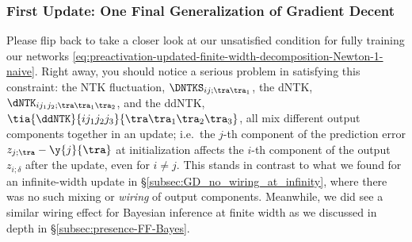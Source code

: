 \subsubsection{First Update: One Final Generalization of Gradient Decent}
Please flip back to take a closer look at our unsatisfied condition for fully training our networks \eqref{eq:preactivation-updated-finite-width-decomposition-Newton-1-naive}.
Right away, you should notice a serious problem in satisfying this constraint: the NTK 
fluctuation, $\DNTKS_{ij;\tra\tra_1}$, the dNTK, $\dNTK_{i j_1j_2;\tra\tra_1\tra_2}$, and the ddNTK, $\tia{\ddNTK}{i j_1j_2j_3}{\tra\tra_1\tra_2\tra_3}$, all
mix different output components together in an update; i.e.~the $j$-th component of the prediction error
$z_{j;\tra}-\y{j}{\tra}$
at initialization affects the $i$-th component of the output
$z_{i;\delta}$
after the update, even for $i\ne j$. This stands in contrast to what we found for an infinite-width update in \S\ref{subsec:GD_no_wiring_at_infinity}, where there was no such mixing or \emph{wiring} of output components. Meanwhile, we did see a similar wiring effect for Bayesian inference at finite width as we discussed in depth in \S\ref{subsec:presence-FF-Bayes}.


